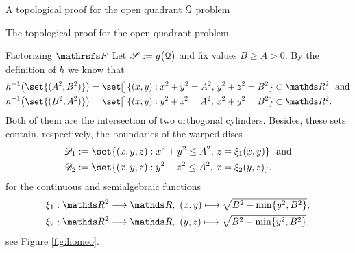 \documentclass[11pt, a4paper, english, twoside, notitlepage, openright]{report}
\begin{document}
\begin{chapter}{A topological proof for the open quadrant $\mathcal{Q}$ problem}
\begin{section}{The topological proof for the open quadrant problem}
\begin{subsection}{Factorizing $\FFF$}
Let $\mathscr{S}:=g\big(\overline{\mathcal{Q}}\big)$ and fix values $B\ge A>0$. By the definition of $h$ we know that
\begin{align*}
&h^{-1}\big(\set{(A^2,B^2)}\big)=\set[\big]{(x,y): x^2+y^2=A^2,\,y^2+z^2=B^2}\subset\R^2 \, \, \text{ and}\\
&h^{-1}\big(\set{(B^2,A^2)}\big)=\set[\big]{(x,y): y^2+z^2=A^2,\,x^2+y^2=B^2}\subset\R^2.
\end{align*} 
Both of them are the intersection of two orthogonal cylinders. Besides, these sets contain, respectively, the boundaries of the warped discs
\begin{align}
&\D_1:= \set{(x,y,z): x^2+y^2\le A^2,\,z=\xi_1(x,y)} \, \, \text{ and}\label{d1}\\
&\D_2:= \set{(x,y,z): y^2+z^2\le A^2,\,x=\xi_2(y,z)},\label{d2}
\end{align}
for the continuous and semialgebraic functions
\begin{align}
&\xi_1:\R^2\longrightarrow\R,\ (x,y)\longmapsto\sqrt{B^2-\min\{y^2,B^2\}},\label{xi1}\\
&\xi_2:\R^2\longrightarrow\R,\ (y,z)\longmapsto\sqrt{B^2-\min\{y^2,B^2\}},\label{xi2}
\end{align}
see Figure \ref{fig:homeo}.


\end{subsection}
\end{section}
\end{chapter}
\end{document}
